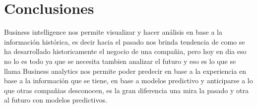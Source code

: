 \section{Conclusiones} 

Business intelligence nos permite visualizar y hacer análisis en base a la información histórica,  es decir hacia el pasado nos brinda tendencia de como se ha desarrollado historicamente el negocio de una compañia, pero hoy en dia eso no lo es todo ya que se necesita tambien analizar el futuro y eso es lo que se llama Business analytics nos permite  poder predecir en base a la experiencia en base a la información que se tiene,  en base a  modelos predictivo y anticiparse a lo que otras compañias  desconocen, es la gran diferencia una mira la pasado y otra al futuro con modelos predictivos.
